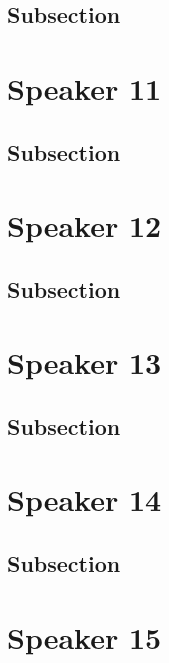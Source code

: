 \documentclass[
]{book}
\begin{document}
\hypertarget{subsection}{%
\section{Subsection}\label{subsection}}

\hypertarget{speaker-11}{%
\chapter*{Speaker 11}\label{speaker-11}}

\hypertarget{subsection}{%
\section{Subsection}\label{subsection}}

\hypertarget{speaker-12}{%
\chapter*{Speaker 12}\label{speaker-12}}

\hypertarget{subsection}{%
\section{Subsection}\label{subsection}}

\hypertarget{speaker-13}{%
\chapter*{Speaker 13}\label{speaker-13}}

\hypertarget{subsection}{%
\section{Subsection}\label{subsection}}

\hypertarget{speaker-14}{%
\chapter*{Speaker 14}\label{speaker-14}}

\hypertarget{subsection}{%
\section{Subsection}\label{subsection}}

\hypertarget{speaker-15}{%
\chapter*{Speaker 15}\label{speaker-15}}
\end{document}
